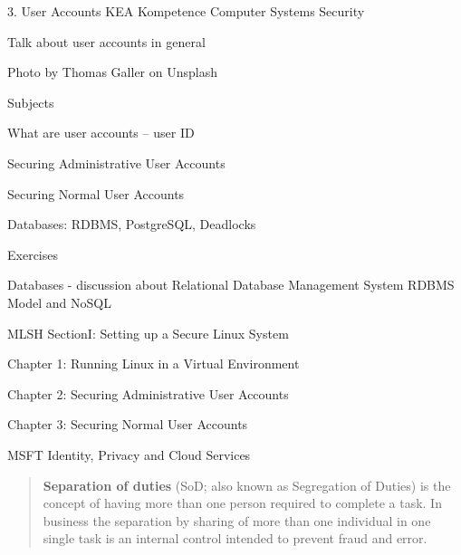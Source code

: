 \documentclass[Screen16to9,17pt]{foils}
\begin{document}
\mytitlepage
{3. User Accounts}
{KEA Kompetence Computer Systems Security \the\year}






\begin{list2}
\item Talk about user accounts in general
\end{list2}

{\small\hfill  Photo by Thomas Galler on Unsplash}


\begin{list1}
\item Subjects
\begin{list2}
\item What are user accounts -- user ID
\item Securing Administrative User Accounts
\item Securing Normal User Accounts
\item Databases: RDBMS, PostgreSQL, Deadlocks
\end{list2}
\item Exercises
\begin{list2}
\item Databases - discussion about Relational Database Management System RDBMS Model and NoSQL
\end{list2}
\end{list1}




MLSH SectionI: Setting up a Secure Linux System
\begin{list1}
\item Chapter 1: Running Linux in a Virtual Environment
\item Chapter 2: Securing Administrative User Accounts
\item Chapter 3: Securing Normal User Accounts
\item MSFT Identity, Privacy and Cloud Services
\end{list1}



\begin{quote}
{\bf Separation of duties} (SoD; also known as Segregation of Duties) is the concept of having more than one person required to complete a task. In business the separation by sharing of more than one individual in one single task is an internal control intended to prevent fraud and error.
\end{quote}
\end{document}
